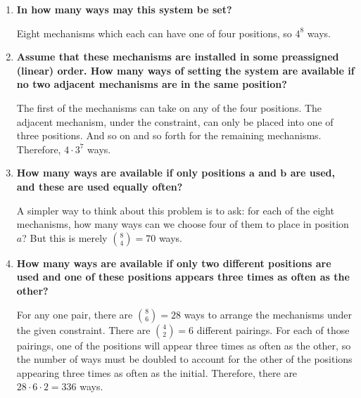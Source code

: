 \documentclass[10pt, oneside]{article}
\begin{document}
\begin{enumerate}[label=2.\arabic*]
  	\begin{enumerate}
	\item \begin{tcolorbox}[
  colback=Cerulean!5!white,
  colframe=Cerulean!75!black]
  \textbf{In how many ways may this system be set?}
  \end{tcolorbox}
  
  	Eight mechanisms which each can have one of four positions, so $\boxed{4^8}$ ways.
  	\item \begin{tcolorbox}[
  colback=Cerulean!5!white,
  colframe=Cerulean!75!black]
  \textbf{Assume that these mechanisms are installed in some preassigned (linear) order. How many ways of setting the system are available if no two adjacent mechanisms are in the same position?}
  \end{tcolorbox}
  
  	The first of the mechanisms can take on any of the four positions. The adjacent mechanism, under the constraint, can only be placed into one of three positions. And so on and so forth for the remaining mechanisms. Therefore, $\boxed{4 \cdot 3^7}$ ways.
  	\item \begin{tcolorbox}[
  colback=Cerulean!5!white,
  colframe=Cerulean!75!black]
  \textbf{How many ways are available if only positions $\bm{a}$ and $\bm{b}$ are used, and these are used equally often?}
  \end{tcolorbox}
  
  	A simpler way to think about this problem is to ask: for each of the eight mechanisms, how many ways can we choose four of them to place in position $a$? But this is merely $\binom{8}{4} = \boxed{70}$ ways.
  	\item \begin{tcolorbox}[
  colback=Cerulean!5!white,
  colframe=Cerulean!75!black]
  \textbf{How many ways are available if only two different positions are used and one of these positions appears three times as often as the other?}
  \end{tcolorbox}
  
  	For any one pair, there are $\binom{8}{6} = 28$ ways to arrange the mechanisms under the given constraint. There are $\binom{4}{2} = 6$ different pairings. For each of those pairings, one of the positions will appear three times as often as the other, so the number of ways must be doubled to account for the other of the positions appearing three times as often as the initial. Therefore, there are $28 \cdot 6 \cdot 2 = \boxed{336}$ ways.
	

\end{enumerate}
\end{enumerate}
\end{document}
